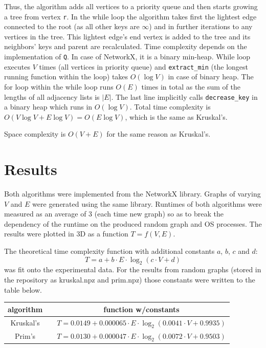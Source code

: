 \documentclass[12pt, a4paper]{article}
\begin{document}
Thus, the algorithm adds all vertices to a priority queue and then starts growing a tree from vertex \texttt{r}. In the while loop the algorithm takes first the lightest edge connected to the root (as all other keys are $\infty$) and in further iterations to any vertices in the tree. This lightest edge's end vertex is added to the tree and its neighbors' keys and parent are recalculated. Time complexity depends on the implementation of \texttt{Q}. In case of NetworkX, it is a binary min-heap. While loop executes $V$ times (all vertices in priority queue) and \texttt{extract\_min} (the longest running function within the loop) takes $O( \log V )$ in case of binary heap. The for loop within the while loop runs $O(E)$ times in total as the sum of the lengths of all adjacency lists is $|E|$. The last line implicitly calls \texttt{decrease\_key} in a binary heap which runs in $O( \log V )$. Total time complexity is $O( V \log V + E \log V ) = O(E \log V)$, which is the same as Kruskal's.

Space complexity is $O(V+E)$ for the same reason as Kruskal's.

\newpage

\section*{Results}

Both algorithms were implemented from the NetworkX library. Graphs of varying $V$ and $E$ were generated using the same library. Runtimes of both algorithms were measured as an average of 3 (each time new graph) so as to break the dependency of the runtime on the produced random graph and OS processes. The results were plotted in 3D as a function $T = f(V, E)$.

The theoretical time complexity function with additional constants $a$, $b$, $c$ and $d$:
\[ T = a + b \cdot E \cdot \log_2 (c \cdot V + d) \]
was fit onto the experimental data. For the results from random graphs (stored in the repository as kruskal.npz and prim.npz) those constants were written to the table below.
\begin{center}
\begin{tabular}{ccc}
	\hline
	algorithm & & function w/constants \\ \hline
	Kruskal's & & $T = 0.0149 + 0.000065 \cdot E \cdot \log_2 (0.0041 \cdot V + 0.9935)$ \\
	Prim's    & & $T = 0.0130 + 0.000047 \cdot E \cdot \log_2 (0.0072 \cdot V + 0.9503)$ \\ \hline
\end{tabular}
\end{center}
\end{document}
